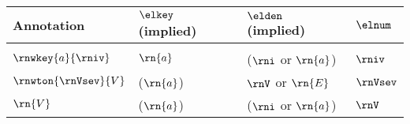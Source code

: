 \begin{tabular}{l|lll}
Annotation & $\elkey$ (implied)       & $\elden$ (implied)       & $\elnum$ \\
\hline \\
$\rnwkey{a}{\rniv}$         & $\rn{a}$              & ($\rni$ or $\rn{a}$)       & $\rniv$       \\
$\rnwton{\rnVsev}{V}$       & ($\rn{a}$)            & $\rnV$ or $\rn{E}$         & $\rnVsev$       \\
$\rn{V}$                    & ($\rn{a}$)            & ($\rni$ or $\rn{a}$)       & $\rnV$    
\end{tabular}
